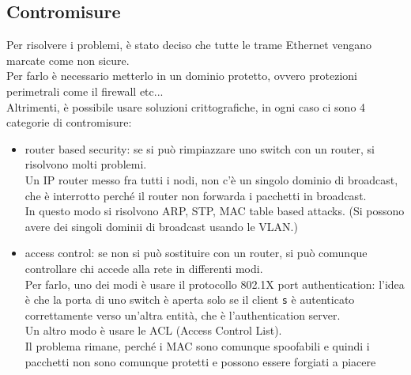 \documentclass[12pt, oneside]{extbook} %
\begin{document}
\subsection{Contromisure}
Per risolvere i problemi, è stato deciso che tutte le trame Ethernet vengano marcate come non sicure.
\\Per farlo è necessario metterlo in un dominio protetto, ovvero protezioni perimetrali come il firewall etc...
\\Altrimenti, è possibile usare soluzioni crittografiche, in ogni caso ci sono 4 categorie di contromisure:
\begin{itemize}
    \item router based security: se si può rimpiazzare uno switch con un router, si risolvono molti problemi.
    \\Un IP router messo fra tutti i nodi, non c'è un singolo dominio di broadcast, che è interrotto perché il router non forwarda i pacchetti in broadcast.
    \\In questo modo si risolvono ARP, STP, MAC table based attacks. (Si possono avere dei singoli dominii di broadcast usando le VLAN.)
    \item access control: se non si può sostituire con un router, si può comunque controllare chi accede alla rete in differenti modi.
    \\Per farlo, uno dei modi è usare il protocollo 802.1X port authentication: l'idea è che la porta di uno switch è aperta solo se il client \texttt{s} è autenticato correttamente verso un'altra entità, che è l'authentication server.
    \\Un altro modo è usare le ACL (Access Control List).
    \\Il problema rimane, perché i MAC sono comunque spoofabili e quindi i pacchetti non sono comunque protetti e possono essere forgiati a piacere
\end{itemize}
\end{document}
